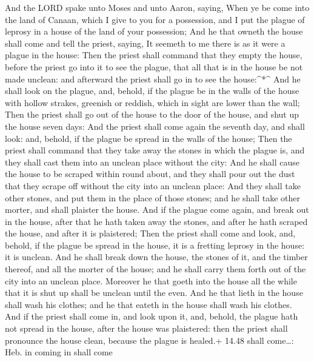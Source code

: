  And the LORD spake unto Moses and unto Aaron, saying,
 When ye be come into the land of Canaan, which I give to
you for a possession, and I put the plague of leprosy in a house of the
land of your possession;  And he that owneth the house
shall come and tell the priest, saying, It seemeth to me there is as it
were a plague in the house:  Then the priest shall command
that they empty the house, before the priest go into it to see the
plague, that all that is in the house be not made unclean: and afterward
the priest shall go in to see the house:\^{}*\^{}  And he
shall look on the plague, and, behold, if the plague be in the walls of
the house with hollow strakes, greenish or reddish, which in sight are
lower than the wall;  Then the priest shall go out of the
house to the door of the house, and shut up the house seven days:
 And the priest shall come again the seventh day, and shall
look: and, behold, if the plague be spread in the walls of the house;
 Then the priest shall command that they take away the
stones in which the plague is, and they shall cast them into an unclean
place without the city:  And he shall cause the house to be
scraped within round about, and they shall pour out the dust that they
scrape off without the city into an unclean place:  And
they shall take other stones, and put them in the place of those stones;
and he shall take other morter, and shall plaister the house.
 And if the plague come again, and break out in the house,
after that he hath taken away the stones, and after he hath scraped the
house, and after it is plaistered;  Then the priest shall
come and look, and, behold, if the plague be spread in the house, it is
a fretting leprosy in the house: it is unclean.  And he
shall break down the house, the stones of it, and the timber thereof,
and all the morter of the house; and he shall carry them forth out of
the city into an unclean place.  Moreover he that goeth
into the house all the while that it is shut up shall be unclean until
the even.  And he that lieth in the house shall wash his
clothes; and he that eateth in the house shall wash his clothes.
 And if the priest shall come in, and look upon it, and,
behold, the plague hath not spread in the house, after the house was
plaistered: then the priest shall pronounce the house clean, because the
plague is healed.+ 14.48 shall come\ldots: Heb. in coming in shall come
